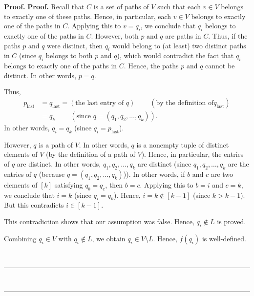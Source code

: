 \documentclass[numbers=enddot,12pt,final,onecolumn,notitlepage]{scrartcl}%
\numberwithin{exer}{section}
\theoremstyle{definition}
\newenvironment{proof}[1][Proof]{\noindent\textbf{#1.} }{\ \rule{0.5em}{0.5em}}
\newenvironment{verlong}{}{}
\begin{document}
\begin{verlong}
\begin{proof}
\begin{proof}
Recall that $C$ is a set of paths of $V$ such that each $v\in V$ belongs to
exactly one of these paths. Hence, in particular, each $v\in V$ belongs to
exactly one of the paths in $C$. Applying this to $v=q_{i}$, we conclude that
$q_{i}$ belongs to exactly one of the paths in $C$. However, both $p$ and $q$
are paths in $C$. Thus, if the paths $p$ and $q$ were distinct, then $q_{i}$
would belong to (at least) two distinct paths in $C$ (since $q_{i}$ belongs to
both $p$ and $q$), which would contradict the fact that $q_{i}$ belongs to
exactly one of the paths in $C$. Hence, the paths $p$ and $q$ cannot be
distinct. In other words, $p=q$.

Thus,
\begin{align*}
p_{\operatorname*{last}}  &  =q_{\operatorname*{last}}=\left(  \text{the last
entry of }q\right)  \ \ \ \ \ \ \ \ \ \ \left(  \text{by the definition of
}q_{\operatorname*{last}}\right) \\
&  =q_{k}\ \ \ \ \ \ \ \ \ \ \left(  \text{since }q=\left(  q_{1},q_{2}%
,\ldots,q_{k}\right)  \right)  .
\end{align*}
In other words, $q_{i}=q_{k}$ (since $q_{i}=p_{\operatorname*{last}}$).

However, $q$ is a path of $V$. In other words, $q$ is a nonempty tuple of
distinct elements of $V$ (by the definition of a path of $V$). Hence, in
particular, the entries of $q$ are distinct. In other words, $q_{1}%
,q_{2},\ldots,q_{k}$ are distinct (since $q_{1},q_{2},\ldots,q_{k}$ are the
entries of $q$ (because $q=\left(  q_{1},q_{2},\ldots,q_{k}\right)  $)). In
other words, if $b$ and $c$ are two elements of $\left[  k\right]  $
satisfying $q_{b}=q_{c}$, then $b=c$. Applying this to $b=i$ and $c=k$, we
conclude that $i=k$ (since $q_{i}=q_{k}$). Hence, $i=k\notin\left[
k-1\right]  $ (since $k>k-1$). But this contradicts $i\in\left[  k-1\right]  $.

This contradiction shows that our assumption was false. Hence, $q_{i}\notin L$
is proved.

Combining $q_{i}\in V$ with $q_{i}\notin L$, we obtain $q_{i}\in V\setminus
L$. Hence, $f\left(  q_{i}\right)  $ is well-defined.


\end{proof}
\end{proof}
\end{verlong}
\end{document}
